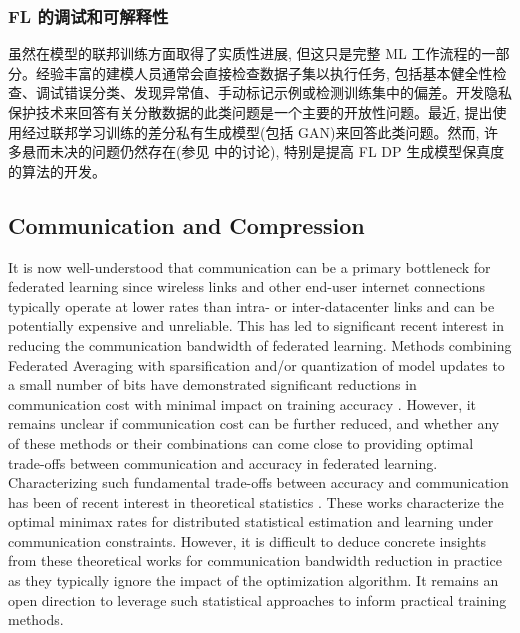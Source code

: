 \subsubsection*{FL 的调试和可解释性}
虽然在模型的联邦训练方面取得了实质性进展, 但这只是完整 ML 工作流程的一部分。经验丰富的建模人员通常会直接检查数据子集以执行任务, 包括基本健全性检查、调试错误分类、发现异常值、手动标记示例或检测训练集中的偏差。开发隐私保护技术来回答有关分散数据的此类问题是一个主要的开放性问题。最近, \citet{augenstein2019generative} 提出使用经过联邦学习训练的差分私有生成模型(包括 GAN)来回答此类问题。然而, 许多悬而未决的问题仍然存在(参见 \citep{augenstein2019generative} 中的讨论), 特别是提高 FL DP 生成模型保真度的算法的开发。



\subsection{Communication and Compression}\label{sec:compr}

It is now well-understood that communication can be a primary bottleneck for federated learning since wireless links and other end-user internet connections typically operate at lower rates than intra- or inter-datacenter links and can be potentially expensive and unreliable. This has led to significant recent interest in reducing the communication bandwidth of federated learning. Methods combining Federated Averaging with sparsification and/or quantization of model updates to a small number of bits have demonstrated significant reductions in communication cost with minimal impact on training accuracy \citep{konevcny2016federated}. However, it remains unclear if communication cost can be further reduced, and whether any of these methods or their combinations can come close to providing optimal trade-offs between communication and accuracy in federated learning. Characterizing such fundamental trade-offs between accuracy and communication has been of recent interest in theoretical statistics \citep{duchi2013,braverman2016, han2018,  acharya2018, barnes2019, tang2019texttt, Barnes2020rtopk}. These works characterize the optimal minimax rates for distributed statistical estimation and learning under communication constraints. However, it is difficult to deduce  concrete insights from these theoretical works for communication bandwidth reduction in practice as they typically ignore the impact of the optimization algorithm. It remains an open direction to leverage such statistical approaches to inform practical training methods.


